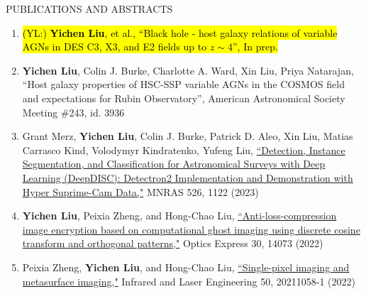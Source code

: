 \documentclass[10pt]{article} %
\DeclareRobustCommand{\yichen}[1]{{\sethlcolor{lime}\hl{(YL:) #1}}}
\begin{document}
\begin{section}{PUBLICATIONS AND ABSTRACTS}
    
\begin{enumerate}[leftmargin=1.5em]
    \item \yichen{\textbf{Yichen Liu}, et al., ``Black hole - host galaxy relations of variable AGNs in DES C3, X3, and E2 fields up to $z\sim4$'', In prep.}
    \item \textbf{Yichen Liu}, Colin J. Burke, Charlotte A. Ward, Xin Liu, Priya Natarajan, ``Host galaxy properties of HSC-SSP variable AGNs in the COSMOS field and expectations for Rubin Observatory'', American Astronomical Society Meeting \#243, id. 3936
    \item Grant Merz, \textbf{Yichen Liu}, Colin J. Burke, Patrick D. Aleo, Xin Liu, Matias Carrasco Kind, Volodymyr Kindratenko, Yufeng Liu, \href{https://academic.oup.com/mnras/advance-article-abstract/doi/10.1093/mnras/stad2785/7273850?redirectedFrom=fulltext}{``Detection, Instance Segmentation, and Classification for Astronomical Surveys with Deep Learning (DeepDISC): Detectron2 Implementation and Demonstration with Hyper Suprime-Cam Data,"} MNRAS 526, 1122 (2023)
    \item \textbf{Yichen Liu}, Peixia Zheng, and Hong-Chao Liu, \href{https://opg.optica.org/oe/fulltext.cfm?uri=oe-30-9-14073&id=471300}{``Anti-loss-compression image encryption based on computational ghost imaging using discrete cosine transform and orthogonal patterns,"} Optics Express 30, 14073 (2022)
    \item Peixia Zheng, \textbf{Yichen Liu}, and Hong-Chao Liu, \href{http://www.irla.cn/cn/article/doi/10.3788/IRLA20211058}{``Single-pixel imaging and metasurface imaging,"} Infrared and Laser Engineering 50, 20211058-1 (2022)
\end{enumerate}

\end{section}
\end{document}
